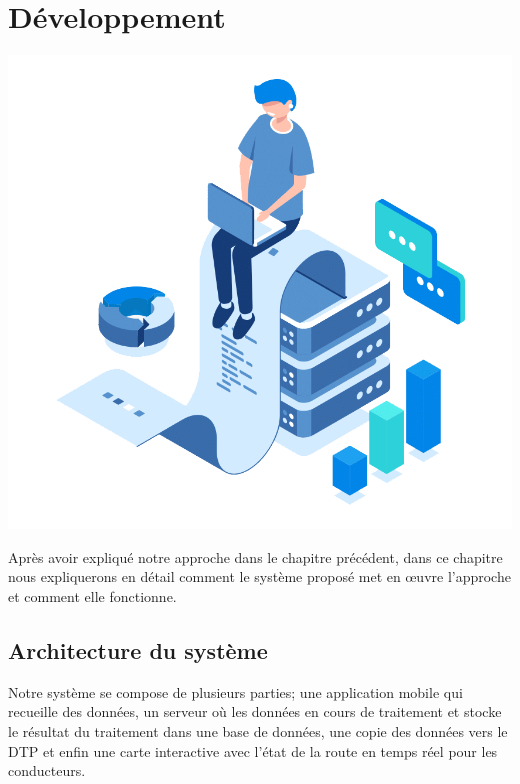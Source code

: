 \chapter{Développement}
\label{chapter:dev}

\label{chapitre4}
		
		\includegraphics [width=1 \linewidth, height=0.8\textheight, keepaspectratio] {Images/chapterFigures/chFour.png}
		
	
		
		\newpage

Après avoir expliqué notre approche dans le chapitre précédent, dans ce chapitre nous expliquerons en détail comment le système proposé met en œuvre l'approche et comment elle fonctionne.

\section{Architecture du système}

Notre système se compose de plusieurs parties; une application mobile qui recueille des données, un serveur où les données en cours de traitement et stocke le résultat du traitement dans une base de données, une copie des données vers le DTP et enfin une carte interactive avec l'état de la route en temps réel pour les conducteurs.

